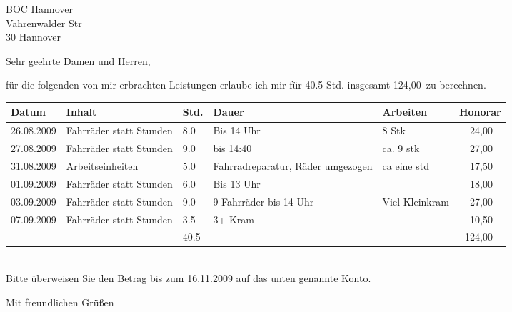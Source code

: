 \documentclass[a4paper,12pt]{scrlttr2}
\begin{document}
\begin{letter}{BOC Hannover\\
Vahrenwalder Str\\
30    Hannover}
\opening{Sehr geehrte Damen und Herren,}
für die folgenden von mir erbrachten Leistungen erlaube ich mir  für 40.5 Std. insgesamt 124,00\officialeuro\ 
 zu berechnen.

\begin{tabular}{|l|l|l|l|l|r|}\hline 
Datum & Inhalt & Std. & Dauer & Arbeiten & Honorar\\\hline \hline 
26.08.2009 & Fahrräder statt Stunden & 8.0 & Bis 14 Uhr & 8 Stk & 24,00 \officialeuro\ \\\hline 
27.08.2009 & Fahrräder statt Stunden & 9.0 & bis 14:40 & ca. 9 stk & 27,00 \officialeuro\ \\\hline 
31.08.2009 & Arbeitseinheiten & 5.0 & Fahrradreparatur, Räder umgezogen & ca eine std & 17,50 \officialeuro\ \\\hline 
01.09.2009 & Fahrräder statt Stunden & 6.0 & Bis 13 Uhr &  & 18,00 \officialeuro\ \\\hline 
03.09.2009 & Fahrräder statt Stunden & 9.0 & 9 Fahrräder bis 14 Uhr & Viel Kleinkram & 27,00 \officialeuro\ \\\hline 
07.09.2009 & Fahrräder statt Stunden & 3.5 & 3+ Kram &  & 10,50 \officialeuro\ \\\hline 
\hline & & 40.5 & & & 124,00 \officialeuro\ \\\hline 
\end{tabular}\\


Bitte überweisen Sie den Betrag bis zum 16.11.2009
 auf das unten genannte Konto.
\closing{Mit freundlichen Grüßen}


\end{letter}
\end{document}
